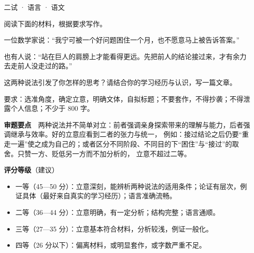 \documentclass[cjk=noto, seal=first]{mojing-exam}
\begin{document}
\begin{paper}[time={建议 2 小时（训练设置）}, full=100]{二试 · 语言 · 语文}

\begin{questions}
\question[50] 阅读下面的材料，根据要求写作。

{\kaishu\hspace{2em}一位数学家说：“我宁可被一个好问题困住一个月，也不愿意马上被告诉答案。”

\hspace{2em}也有人说：“站在巨人的肩膀上才能看得更远。先把前人的结论接过来，才有余力去走前人没走过的路。”\par}

\hspace{2em}这两种说法引发了你怎样的思考？请结合你的学习经历与认识，写一篇文章。

\hspace{2em}要求：选准角度，确定立意，明确文体，自拟标题；不要套作，不得抄袭；不得泄露个人信息；不少于 800 字。
\answerspace{2cm}
\begin{solution}
\textbf{审题要点}　两种说法并不简单对立：前者强调亲身探索带来的理解与能力，后者强调继承与效率。好的立意应看到二者的张力与统一，
例如：接过结论之后仍要“重走一遍”使之成为自己的；或者区分不同阶段、不同目的下“困住”与“接过”的取舍。只赞一方、贬低另一方而不加分析的，
立意不超过二等。

\textbf{评分等级}（建议）
\begin{itemize}
  \item 一等（45—50 分）：立意深刻，能辨析两种说法的适用条件；论证有层次，例证具体（最好来自真实的学习经历）；语言准确流畅。
  \item 二等（36—44 分）：立意明确，有一定分析；结构完整；语言通顺。
  \item 三等（27—35 分）：立意基本符合材料，分析较浅，例证一般化。
  \item 四等（26 分以下）：偏离材料，或明显套作，或字数严重不足。
\end{itemize}
\end{solution}
\end{questions}

\end{paper}
\end{document}
